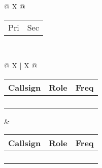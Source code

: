 {\begin{tabularx}{\textwidth}{ @{} X @{} }
	\\[-3ex] \midrule
	{\begin{tabularx}{\textwidth}{@{} *{2}X @{}}
		Pri & Sec\\[-3ex]
	\end{tabularx}}\\ \midrule
	{\begin{tabularx}{\textwidth}{@{} X | X @{}}
		{\begin{tabularx}{\linewidth}{@{} *{3}X @{}}
			Callsign & Role & Freq\\[-3ex] \midrule
			\hfill & \hfill & \hfill\\ \midrule
			\hfill & \hfill & \hfill\\ \midrule
			\hfill & \hfill & \hfill\\ \midrule
			\hfill & \hfill & \hfill\\
		\end{tabularx}} &
		{\begin{tabularx}{\linewidth}{@{} *{3}X @{}}
			Callsign & Role & Freq\\[-3ex] \midrule	
			\hfill & \hfill & \hfill\\ \midrule
			\hfill & \hfill & \hfill\\ \midrule
			\hfill & \hfill & \hfill\\ \midrule
			\hfill & \hfill & \hfill\\
		\end{tabularx}}\\
	\end{tabularx}}\\ \midrule
	

\end{tabularx}}

